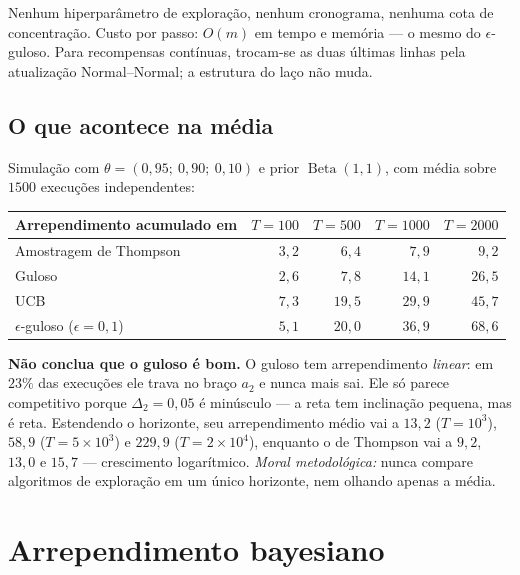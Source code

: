 \documentclass[11pt, a4paper]{article}
\newcommand{\Bdist}{\operatorname{Beta}}
\begin{document}
Nenhum hiperparâmetro de exploração, nenhum cronograma, nenhuma cota de
concentração. Custo por passo: $O(m)$ em tempo e memória — o mesmo do
$\epsilon$-guloso. Para recompensas contínuas, trocam-se as duas últimas linhas
pela atualização Normal--Normal; a estrutura do laço não muda.

\subsection*{O que acontece na média}

Simulação com $\theta = (0{,}95;\ 0{,}90;\ 0{,}10)$ e prior $\Bdist(1,1)$,
com média sobre $1500$ execuções independentes:

\begin{center}\small
\begin{tabular}{@{}lrrrr@{}}
\toprule
\textbf{Arrependimento acumulado em} & $T=100$ & $T=500$ & $T=1000$ & $T=2000$ \\
\midrule
Amostragem de Thompson   & $3{,}2$ & $6{,}4$  & $7{,}9$  & $9{,}2$ \\
Guloso                   & $2{,}6$ & $7{,}8$  & $14{,}1$ & $26{,}5$ \\
UCB                      & $7{,}3$ & $19{,}5$ & $29{,}9$ & $45{,}7$ \\
$\epsilon$-guloso ($\epsilon = 0{,}1$) & $5{,}1$ & $20{,}0$ & $36{,}9$ & $68{,}6$ \\
\bottomrule
\end{tabular}
\end{center}

\begin{alertabox}
\textbf{Não conclua que o guloso é bom.} O guloso tem arrependimento
\emph{linear}: em $23\%$ das execuções ele trava no braço $a_2$ e nunca mais
sai. Ele só parece competitivo porque $\Delta_2 = 0{,}05$ é minúsculo — a reta
tem inclinação pequena, mas é reta. Estendendo o horizonte, seu arrependimento
médio vai a $13{,}2$ ($T=10^3$), $58{,}9$ ($T=5\times10^3$) e $229{,}9$
($T=2\times10^4$), enquanto o de Thompson vai a $9{,}2$, $13{,}0$ e $15{,}7$ —
crescimento logarítmico. \emph{Moral metodológica:} nunca compare algoritmos de
exploração em um único horizonte, nem olhando apenas a média.
\end{alertabox}

\section{Arrependimento bayesiano}
\end{document}
